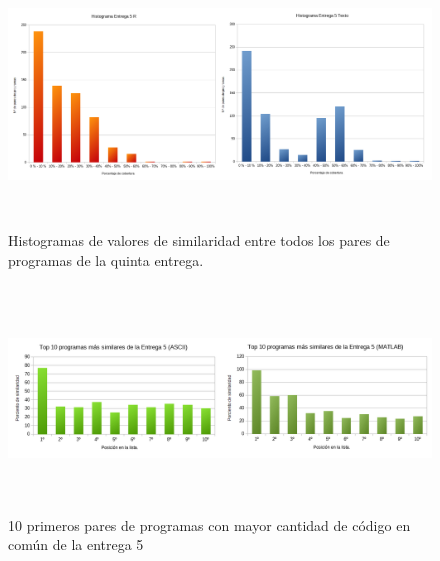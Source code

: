 \begin{figure}[H] %
\centering
\includegraphics[width=15cm, height=7cm]{imagenes/histograma5.png}  %
\caption{Histogramas de valores de similaridad entre todos los pares de programas de la quinta entrega.} \label{fig:histograma5}
\end{figure}





\begin{figure}[H] %
\centering
\includegraphics[width=14cm, height=6cm]{imagenes/TOP10_5.png}  %
\caption{10 primeros pares de programas con mayor cantidad de código en común de la entrega 5} \label{fig:TOP10_5}
\end{figure}



